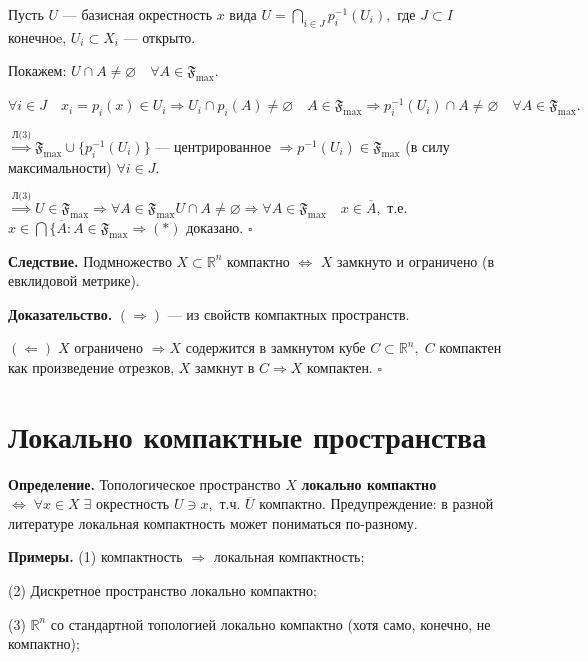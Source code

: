\documentclass[12pt,a4paper]{article}
\begin{document}
Пусть $U$ --- базисная окрестность $x$ вида $U = \underset{i \in J}{\bigcap} p_{i}^{-1}(U_{i}),$ где $J \subset I$ конечноe, $U_{i} \subset X_{i}$ --- открыто. 

Покажем: $U \cap A \neq \varnothing \quad \forall A \in \mathfrak{F}_{\max}.$

$\forall i \in J \quad x_{i} = p_{i}(x) \in U_{i} \Rightarrow U_{i} \cap p_{i}(A) \neq \varnothing \quad A \in \mathfrak{F}_{\max} \Rightarrow p_{i}^{-1}(U_{i}) \cap A \neq \varnothing \quad \forall A \in \mathfrak{F}_{\max}.$

$\overset{\text{Л(3)}}{\Rightarrow} \mathfrak{F}_{\max} \cup \{p_{i}^{-1}(U_{i})\}$ --- центрированное $\Rightarrow p^{-1}(U_{i}) \in \mathfrak{F}_{\max}$ (в силу максимальности) $\forall i \in J.$

$\overset{\text{Л(3)}}{\Rightarrow} U \in \mathfrak{F}_{\max} \Rightarrow \forall A \in \mathfrak{F}_{\max} U \cap A \neq \varnothing \Rightarrow \forall A \in \mathfrak{F}_{\max} \quad x \in \overline{A},$ т.е. $x \in \bigcap \{\overline{A}\!: A \in \mathfrak{F}_{\max} \Rightarrow (*)$ доказано. $\square$ 

\textbf{Следствие.} Подмножество $X \subset \mathbb{R}^{n}$ компактно $\Leftrightarrow$ $X$ замкнуто и ограничено (в евклидовой метрике).

\textbf{Доказательство.} $(\Rightarrow)$ --- из свойств компактных пространств. 

$(\Leftarrow) \; X$ ограничено $\Rightarrow X$ содержится в замкнутом кубе $C \subset \mathbb{R}^{n}, \; C$ компактен как произведение отрезков, $X$ замкнут в $C \Rightarrow X$ компактен. $\square$

\section{Локально компактные пространства}

\textbf{Определение.} Топологическое пространство $X$ \textbf{локально компактно} $\Leftrightarrow \; \forall x \in X \; \exists$ окрестность $U \ni x,$ т.ч. $\overline{U}$ компактно. Предупреждение: в разной литературе локальная компактность может пониматься по-разному.

\textbf{Примеры.} (1) компактность $\Rightarrow$ локальная компактность;

(2) Дискретное пространство локально компактно;

(3) $\mathbb{R}^{n}$ со стандартной топологией локально компактно (хотя само, конечно, не компактно);
\end{document}
